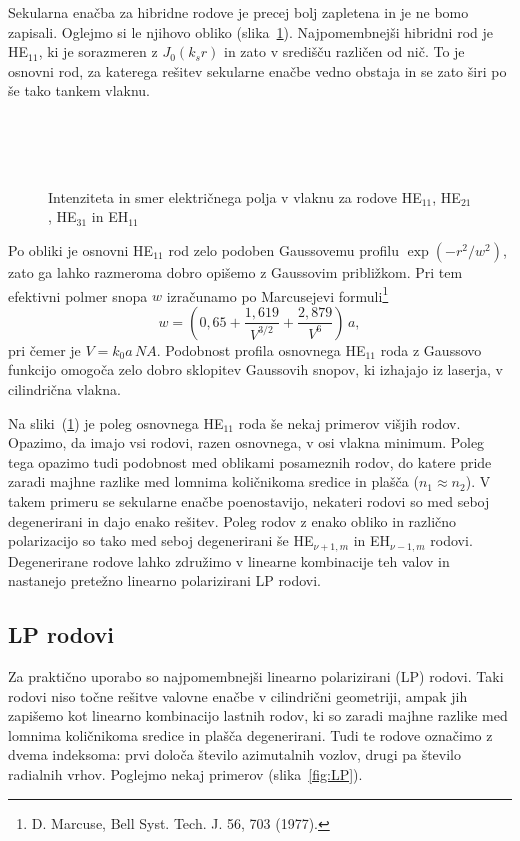 Sekularna enačba za hibridne rodove je precej bolj zapletena in je ne bomo zapisali. 
Oglejmo si le njihovo obliko (slika~\ref{fig:HE11}). Najpomembnejši hibridni rod je HE$_{11}$, 
ki je sorazmeren z $J_0(k_sr)$ in zato v središču različen od nič. 
To je osnovni rod, za katerega rešitev sekularne enačbe vedno obstaja in se
zato širi po še tako tankem vlaknu. 
\begin{figure}[h]
\centering
\def\svgwidth{85truemm} 
\\
\def\svgwidth{85truemm} 
 \\
\def\svgwidth{85truemm} 
 \\
\def\svgwidth{85truemm} 

\caption{Intenziteta in smer električnega polja v vlaknu za rodove
HE$_{11}$, HE$_{21}$, HE$_{31}$ in EH$_{11}$}
\label{fig:HE11}
\end{figure}

Po obliki je osnovni HE$_{11}$ rod zelo podoben Gaussovemu profilu $\exp(-r^2/w^2)$,
zato ga lahko razmeroma dobro opišemo z Gaussovim približkom. 
Pri tem efektivni polmer snopa
$w$ izračunamo po Marcusejevi
 formuli\footnote{D. Marcuse, Bell Syst. Tech. J. 56, 703 (1977).}
\begin{equation} 
w = (0,65 + \frac{1,619}{V^{3/2}}+\frac{2,879}{V^{6}})\,a,
\label{Marcuse}
\end{equation}
pri čemer je $V = k_0 a\,NA $. Podobnost profila osnovnega
HE$_{11}$ roda z Gaussovo funkcijo omogoča zelo dobro sklopitev Gaussovih
snopov, ki izhajajo iz laserja, v cilindrična vlakna.

Na sliki~(\ref{fig:HE11}) je poleg osnovnega HE$_{11}$ roda še nekaj primerov višjih rodov. Opazimo, 
da imajo vsi rodovi, razen osnovnega, v osi vlakna minimum. Poleg tega opazimo tudi podobnost med 
oblikami posameznih rodov, do katere pride zaradi majhne razlike med lomnima količnikoma sredice in plašča
($n_1 \approx n_2$). V takem primeru se sekularne enačbe poenostavijo, nekateri rodovi so 
med seboj degenerirani in dajo enako rešitev. Poleg rodov z enako obliko in različno polarizacijo so tako 
med seboj degenerirani še HE$_{\nu+1,m}$ in EH$_{\nu-1,m}$ rodovi. Degenerirane 
rodove lahko združimo v linearne kombinacije teh valov in nastanejo pretežno 
linearno polarizirani LP rodovi. 

\subsection*{LP rodovi}
Za praktično uporabo so najpomembnejši linearno polarizirani (LP) rodovi. Taki rodovi niso
točne rešitve valovne enačbe v cilindrični geometriji, ampak jih zapišemo kot linearno 
kombinacijo lastnih rodov, ki so zaradi majhne razlike med lomnima količnikoma sredice
in plašča degenerirani. Tudi te rodove označimo z dvema indeksoma: prvi določa število azimutalnih
vozlov, drugi pa število radialnih vrhov. Poglejmo nekaj primerov (slika~\ref{fig:LP}).

